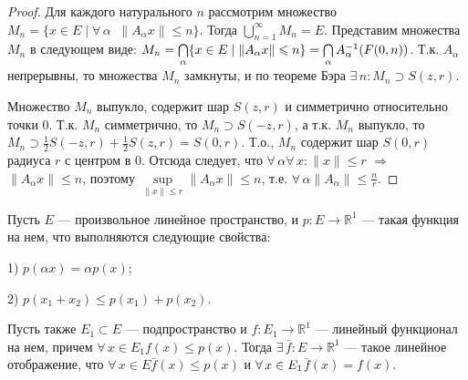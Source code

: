 \documentclass[10pt,titlepage, a4paper]{article}
\begin{document}
\begin{proof}
Для каждого натурального $n$ рассмотрим множество $M_n=\{x\in E\mid
\forall\,\alpha\;\;\|A_\alpha x\|\leqslant n\}$. Тогда
$\bigcup\limits_{n=1}^\infty M_n=E$. Представим множества $M_n$ в
следующем виде: $M_n=\bigcap\limits_\alpha \{x\in E\mid \|A_\alpha
x\|\leqslant n\}\p=\bigcap\limits_\alpha A^{-1}_\alpha(F(0,n))$.
Т.к. $A_\alpha$ непрерывны, то множества $M_n$ замкнуты, и по
теореме Бэра $\exists\,n:M_n\supset S(z,r)$.

Множество $M_n$ выпукло, содержит шар $S(z,r)$ и симметрично
относительно точки 0. Т.к. $M_n$ симметрично, то $M_n\supset
S(-z,r)$, а т.к. $M_n$ выпукло, то $M_n\supset \frac 1 2
S(-z,r)+\frac 1 2 S(z,r)=S(0,r)$. Т.о., $M_n$ содержит шар $S(0,r)$
радиуса $r$ с центром в 0. Отсюда следует, что
$\forall\,\alpha$\;\;$\forall\,x:\|x\|\leqslant r$ $\Rightarrow$
$\|A_\alpha x\|\leqslant n$, поэтому $\sup\limits_{\|x\|\leqslant
r}\|A_\alpha x\|\leqslant n$, т.е.
$\forall\,\alpha$\;\;$\|A_\alpha\|\leqslant \frac n r$.
\end{proof}
\lecture

\begin{theorem}
Пусть $E$ --- произвольное линейное пространство, и $p\colon
E\to\mathbb{R}^1$
--- такая функция на нем, что выполняются следующие свойства:

1) $p(\alpha x)=\alpha p(x)$;

2) $p(x_1+x_2)\leqslant p(x_1)+p(x_2)$.

Пусть также $E_1\subset E$ --- подпространство и $f\colon
E_1\to\mathbb{R}^1$ --- линейный функционал на нем, причем
$\forall\,x\in E_1$\;\;$f(x)\leqslant p(x)$. Тогда
$\exists\,\bar{f}\colon E\to \mathbb{R}^1$ --- такое линейное
отображение, что $\forall\,x\in E$\;\;$\bar{f}(x)\leqslant p(x)$ и
$\forall\,x\p\in E_1$\;\;$\bar{f}(x)=f(x)$.
\end{theorem}
\end{document}
